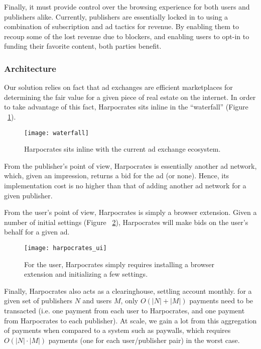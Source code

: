 Finally, it must provide control over the browsing experience for both users and publishers alike.
Currently, publishers are essentially locked in to using a combination of subscription and ad tactics for revenue.
By enabling them to recoup some of the lost revenue due to blockers, and enabling users to opt-in to funding their favorite content, both parties benefit.

\subsubsection{Architecture}
Our solution relies on fact that ad exchanges are efficient marketplaces for determining the fair value for a given piece of real estate on the internet.
In order to take advantage of this fact, Harpocrates sits inline in the ``waterfall'' (Figure ~\ref{fig:waterfall}).

\begin{figure}[h]
\centering
\texttt{[image: waterfall]}
\caption{Harpocrates sits inline with the current ad exchange ecosystem.}
\label{fig:waterfall}
\end{figure}

From the publisher's point of view, Harpocrates is essentially another ad network, which, given an impression, returns a bid for the ad (or none).
Hence, its implementation cost is no higher than that of adding another ad network for a given publisher.

From the user's point of view, Harpocrates is simply a browser extension.
Given a number of initial settings (Figure ~\ref{fig:harpocrates_ui}), Harpocrates will make bids on the user's behalf for a given ad.

\begin{figure}[h]
\centering
\texttt{[image: harpocrates\_ui]}
\caption{For the user, Harpocrates simply requires installing a browser extension and initializing a few settings.}
\label{fig:harpocrates_ui}
\end{figure}

Finally, Harpocrates also acts as a clearinghouse, settling account monthly.
for a given set of publishers $N$ and users $M$, only $O(|N| + |M|)$ payments need to be transacted (i.e. one payment from each user to Harpocrates, and one payment from Harpocrates to each publisher).
At scale, we gain a lot from this aggregation of payments when compared to a system such as paywalls, which requires $O(|N| \cdot |M|)$ payments (one for each user/publisher pair) in the worst case.

